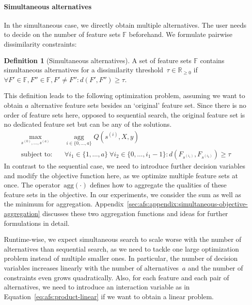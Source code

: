 \documentclass{article}
\theoremstyle{definition}
\newtheorem{definition}[corollary]{Definition}
\begin{document}
\paragraph{Simultaneous alternatives}

In the simultaneous case, we directly obtain multiple alternatives.
The user needs to decide on the number of feature sets $\mathbb{F}$ beforehand.
We formulate pairwise dissimilarity constraints:
%
\begin{definition}[Simultaneous alternatives]
	A set of feature sets $\mathbb{F}$ contains simultaneous alternatives for a dissimilarity threshold~$\tau \in \mathbb{R}_{\geq 0}$ if $\forall F' \in \mathbb{F}, F'' \in \mathbb{F}, F' \neq F'': d(F',F'') \geq \tau$.
	\label{def:afs:simultaneous-alternative}
\end{definition}
%
This definition leads to the following optimization problem, assuming we want to obtain $a$ alternative feature sets besides an `original' feature set.
Since there is no order of feature sets here, opposed to sequential search, the original feature set is no dedicated feature set but can be any of the solutions.
%
\begin{equation}
	\begin{aligned}
		\max_{s^{(0)}, \dots, s^{(a)}} &\quad \operatorname*{agg}_{i \in \{0, \dots, a\}} Q(s^{(i)},X,y) \\
		\text{subject to:} &\quad \forall i_1 \in \{1, \dots, a\}~\forall i_2 \in \{0, \dots, i_1-1\}: d(F_{s^{(i_1)}},F_{s^{(i_2)}}) \geq \tau
	\end{aligned}
	\label{eq:afs:afs-simultaneous}
\end{equation}
%
In contrast to the sequential case, we need to introduce further decision variables and modify the objective function here, as we optimize multiple feature sets at once.
The operator~$\text{agg}(\cdot)$ defines how to aggregate the qualities of these feature sets in the objective.
In our experiments, we consider the sum as well as the minimum for aggregation.
Appendix~\ref{sec:afs:appendix:simultaneous-objective-aggregation} discusses these two aggregation functions and ideas for further formulations in detail.

Runtime-wise, we expect simultaneous search to scale worse with the number of alternatives than sequential search, as we need to tackle one large optimization problem instead of multiple smaller ones.
In particular, the number of decision variables increases linearly with the number of alternatives~$a$ and the number of constraints even grows quadratically.
Also, for each feature and each pair of alternatives, we need to introduce an interaction variable as in Equation~\ref{eq:afs:product-linear} if we want to obtain a linear problem.
\end{document}
